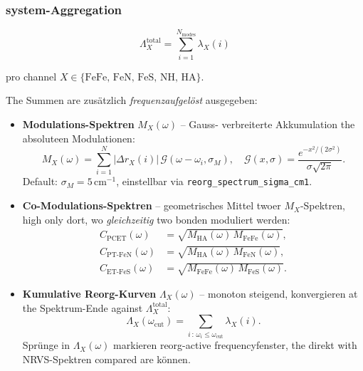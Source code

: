 \documentclass[11pt,a4paper,twoside]{article}
\theoremstyle{remark}
\begin{document}
\subsubsection*{system-Aggregation}

\begin{equation}
  \Lambda_X^\text{total} = \sum_{i=1}^{N_\text{modes}} \lambda_X(i)
  \label{eq:lambda-total}
\end{equation}

pro channel $X \in \{\text{FeFe, FeN, FeS, NH, HA}\}$.

The Summen are zus\"atzlich \emph{frequenzaufgel\"ost} ausgegeben:

\begin{itemize}
  \item \textbf{Modulations-Spektren} $M_X(\omega)$ -- Gauss-
        verbreiterte Akkumulation the absoluteen Modulationen:
        \begin{equation}
          M_X(\omega)
          = \sum_{i=1}^{N} |\Delta r_X(i)|\,
            \mathcal{G}(\omega - \omega_i, \sigma_M),
          \quad
          \mathcal{G}(x,\sigma) = \frac{e^{-x^2/(2\sigma^2)}}{\sigma\sqrt{2\pi}}.
          \label{eq:M-spectrum}
        \end{equation}
        Default: $\sigma_M = 5$\,cm$^{-1}$, einstellbar via
        \texttt{reorg\_spectrum\_sigma\_cm1}.

  \item \textbf{Co-Modulations-Spektren} -- geometrisches Mittel
        twoer $M_X$-Spektren, high only dort, wo \emph{gleichzeitig}
        two bonden moduliert werden:
        \begin{align}
          C_\text{PCET}(\omega) &= \sqrt{M_\text{HA}(\omega)\, M_\text{FeFe}(\omega)},\\
          C_{\text{PT-FeN}}(\omega) &= \sqrt{M_\text{HA}(\omega)\, M_\text{FeN}(\omega)},\\
          C_{\text{ET-FeS}}(\omega) &= \sqrt{M_\text{FeFe}(\omega)\, M_\text{FeS}(\omega)}.
        \end{align}

  \item \textbf{Kumulative Reorg-Kurven} $\Lambda_X(\omega)$ -- monoton
        steigend, konvergieren at the Spektrum-Ende against $\Lambda_X^\text{total}$:
        \begin{equation}
          \Lambda_X(\omega_\text{cut})
          = \sum_{i\,:\,\omega_i \le \omega_\text{cut}} \lambda_X(i).
        \end{equation}
        Spr\"unge in $\Lambda_X(\omega)$ markieren reorg-active
        frequencyfenster, the direkt with NRVS-Spektren compared
        are k\"onnen.
\end{itemize}
\end{document}
